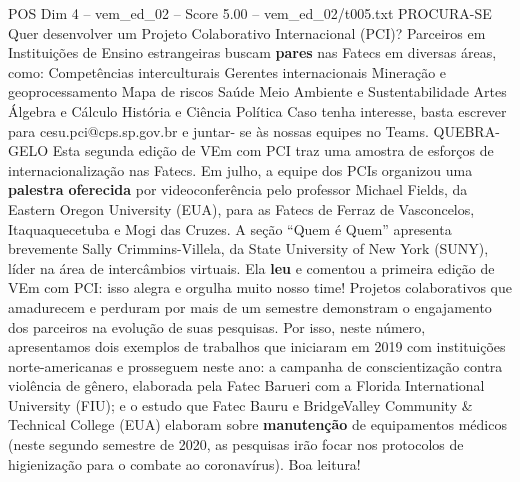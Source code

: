 \begin{textsample}{POS Dim 4 – vem\_ed\_02 – Score 5.00 – vem\_ed\_02/t005.txt}  \label{ex:f4_pos_025}
PROCURA-SE Quer desenvolver um Projeto Colaborativo Internacional (PCI)?
Parceiros em Instituições de Ensino estrangeiras buscam \textbf{pares} nas Fatecs em diversas áreas, como: Competências interculturais Gerentes internacionais Mineração e geoprocessamento Mapa de riscos Saúde Meio Ambiente e Sustentabilidade Artes Álgebra e Cálculo História e Ciência Política Caso tenha interesse, basta escrever para cesu.pci@cps.sp.gov.br e juntar- se às nossas equipes no Teams.
QUEBRA-GELO Esta segunda edição de VEm com PCI traz uma amostra de esforços de internacionalização nas Fatecs.
Em julho, a equipe dos PCIs organizou uma \textbf{palestra} \textbf{oferecida} por videoconferência pelo professor Michael Fields, da Eastern Oregon University (EUA), para as Fatecs de Ferraz de Vasconcelos, Itaquaquecetuba e Mogi das Cruzes.
A seção “Quem é Quem” apresenta brevemente Sally Crimmins-Villela, da State University of New York (SUNY), líder na área de intercâmbios virtuais.
Ela \textbf{leu} e comentou a primeira edição de VEm com PCI: isso alegra e orgulha muito nosso time!
Projetos colaborativos que amadurecem e perduram por mais de um semestre demonstram o engajamento dos parceiros na evolução de suas pesquisas.
Por isso, neste número, apresentamos dois exemplos de trabalhos que iniciaram em 2019 com instituições norte-americanas e prosseguem neste ano: a campanha de conscientização contra violência de gênero, elaborada pela Fatec Barueri com a Florida International University (FIU); e o estudo que Fatec Bauru e BridgeValley Community \& Technical College (EUA) elaboram sobre \textbf{manutenção} de equipamentos médicos (neste segundo semestre de 2020, as pesquisas irão focar nos protocolos de higienização para o combate ao coronavírus).
Boa leitura!

\end{textsample}
